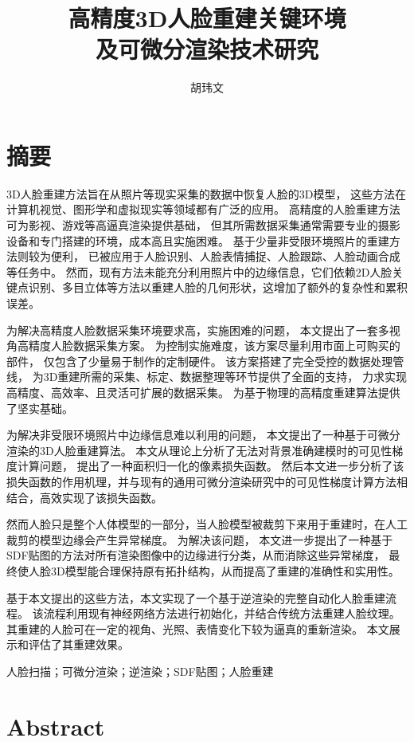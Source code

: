 \documentclass{scutmaster}
\title{高精度3D人脸重建关键环境\texorpdfstring{\\}{}及可微分渲染技术研究}
\date{\zhtoday}
\author{胡玮文}
\newcommand{\changed}[1]{{\color{red}#1}}
\begin{document}
\maketitle
\hideinblind{
    \maketitleEN
    \nominationpage
    \declareoforiginality
}

\frontmatter
\chapter{摘\texorpdfstring{\quad}{}要}

\changed{
3D人脸重建方法旨在从照片等现实采集的数据中恢复人脸的3D模型，
这些方法在计算机视觉、图形学和虚拟现实等领域都有广泛的应用。
高精度的人脸重建方法可为影视、游戏等高逼真渲染提供基础，
但其所需数据采集通常需要专业的摄影设备和专门搭建的环境，成本高且实施困难。
基于少量非受限环境照片的重建方法则较为便利，
已被应用于人脸识别、人脸表情捕捉、人脸跟踪、人脸动画合成等任务中。
然而，现有方法未能充分利用照片中的边缘信息，它们依赖2D人脸关键点识别、多目立体等方法以重建人脸的几何形状，这增加了额外的复杂性和累积误差。

为解决高精度人脸数据采集环境要求高，实施困难的问题，
本文提出了一套多视角高精度人脸数据采集方案。
为控制实施难度，该方案尽量利用市面上可购买的部件，
仅包含了少量易于制作的定制硬件。
该方案搭建了完全受控的数据处理管线，
为3D重建所需的采集、标定、数据整理等环节提供了全面的支持，
力求实现高精度、高效率、且灵活可扩展的数据采集。
为基于物理的高精度重建算法提供了坚实基础。
}

为解决非受限环境照片中边缘信息难以利用的问题，
本文提出了一种基于可微分渲染的3D人脸重建算法。
本文从理论上分析了无法对背景准确建模时的可见性梯度计算问题，
提出了一种面积归一化的像素损失函数。
然后本文进一步分析了该损失函数的作用机理，并与现有的通用可微分渲染研究中的可见性梯度计算方法相结合，高效实现了该损失函数。

然而人脸只是整个人体模型的一部分，当人脸模型被裁剪下来用于重建时，在人工裁剪的模型边缘会产生异常梯度。
为解决该问题，
本文进一步提出了一种基于SDF贴图的方法对所有渲染图像中的边缘进行分类，从而消除这些异常梯度，
最终使人脸3D模型能合理保持原有拓扑结构，从而提高了重建的准确性和实用性。

基于本文提出的这些方法，本文实现了一个基于逆渲染的完整自动化人脸重建流程。
该流程利用现有神经网络方法进行初始化，并结合传统方法重建人脸纹理。
其重建的人脸可在一定的视角、光照、表情变化下较为逼真的重新渲染。
本文展示和评估了其重建效果。

 \changed{人脸扫描}；可微分渲染；逆渲染；SDF贴图；人脸重建

\chapter{Abstract}
\end{document}
